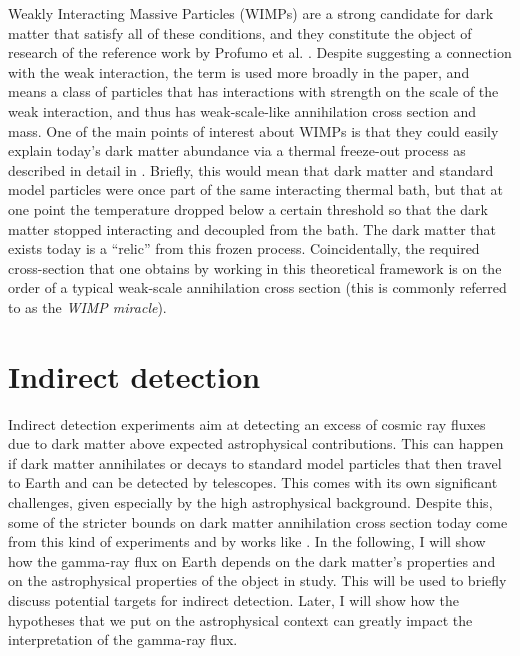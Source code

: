 Weakly Interacting Massive Particles (WIMPs) are a strong candidate for dark matter that satisfy all of these conditions, and they constitute the object of research of the reference work by Profumo et al. \cite{Profumo_2018}. Despite suggesting a connection with the weak interaction, the term is used more broadly in the paper, and means a class of particles that has interactions with strength on the scale of the weak interaction, and thus has weak-scale-like annihilation cross section and mass. One of the main points of interest about WIMPs is that they could easily explain today's dark matter abundance via a thermal freeze-out process as described in detail in \cite[Chapter 4]{Cirelli_2024}. Briefly, this would mean that dark matter and standard model particles were once part of the same interacting thermal bath, but that at one point the temperature dropped below a certain threshold so that the dark matter stopped interacting and decoupled from the bath. The dark matter that exists today is a ``relic'' from this frozen process. Coincidentally, the required cross-section that one obtains by working in this theoretical framework is on the order of a typical weak-scale annihilation cross section (this is commonly referred to as the \emph{WIMP miracle}).

\section{Indirect detection}\label{sec:indirect_detection}
Indirect detection experiments aim at detecting an excess of cosmic ray fluxes due to dark matter above expected astrophysical contributions. This can happen if dark matter annihilates or decays to standard model particles that then travel to Earth and can be detected by telescopes. This comes with its own significant challenges, given especially by the high astrophysical background. Despite this, some of the stricter bounds on dark matter annihilation cross section today \cite{Hooper_2018} come from this kind of experiments and by works like \cite{Profumo_2018}. In the following, I will show how the gamma-ray flux on Earth depends on the dark matter's properties and on the astrophysical properties of the object in study. This will be used to briefly discuss potential targets for indirect detection. Later, I will show how the hypotheses that we put on the astrophysical context can greatly impact the interpretation of the gamma-ray flux.

